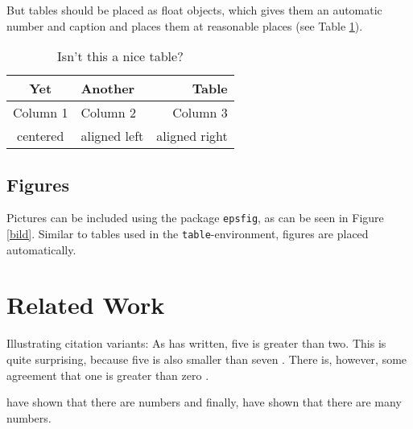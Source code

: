 \documentclass[12pt,leqno,a4paper]{article}
\begin{document}
But tables should be placed as float objects, which gives them an automatic number and caption and places them at reasonable places (see Table \ref{tabelle}).

\begin{table}
\begin{center}
\begin{tabular}{clr}
\toprule
Yet & Another & Table \\
\midrule
Column 1 & Column 2 & Column 3 \\
centered & aligned left &  aligned right \\
\bottomrule
\end{tabular}
\caption{Isn't this a nice table?}\label{tabelle}
\end{center}
\end{table}

\subsection{Figures}

Pictures can be included using the package \texttt{epsfig}, as can be seen in Figure \ref{bild}. Similar to tables used in the \texttt{table}-environment, figures are placed automatically.



\section{Related Work}
Illustrating citation variants: As \cite{Doe:2014aa} has written, five is greater than two. This is quite surprising, because five is also smaller than seven \citep{Done:2014aa}. There is, however, some agreement that one is greater than zero \citep{Doe:2014aa,Done:2014aa}. 

\cite{Done:2015aa} have shown that there are numbers and finally, \cite{Smith:2016aa} have shown that there are many numbers.




\end{document}
